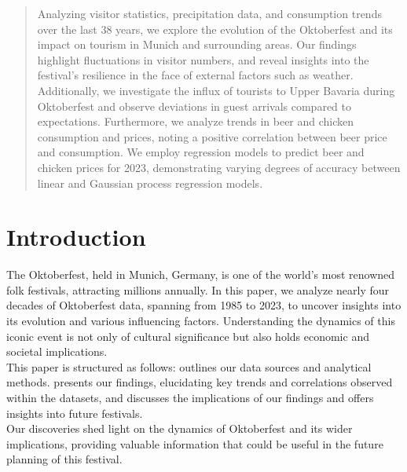 \documentclass{article}
\theoremstyle{plain}
\theoremstyle{definition}
\theoremstyle{remark}
\begin{document}
\printAffiliationsAndNotice{\icmlEqualContribution} %

\begin{abstract}
Analyzing visitor statistics, precipitation data, and consumption trends over the last 38 years, we explore the evolution of the Oktoberfest and its impact on tourism in Munich and surrounding areas. Our findings highlight fluctuations in visitor numbers, and reveal insights into the festival's resilience in the face of external factors such as weather. Additionally, we investigate the influx of tourists to Upper Bavaria during Oktoberfest and observe deviations in guest arrivals compared to expectations. Furthermore, we analyze trends in beer and chicken consumption and prices, noting a positive correlation between beer price and consumption. We employ regression models to predict beer and chicken prices for 2023, demonstrating varying degrees of accuracy between linear and Gaussian process regression models.
\end{abstract}

\section{Introduction}\label{sec:intro}
The Oktoberfest, held in Munich, Germany, is one of the world's most renowned folk festivals, attracting millions annually. In this paper, we analyze nearly four decades of Oktoberfest data, spanning from 1985 to 2023, to uncover insights into its evolution and various influencing factors. Understanding the dynamics of this iconic event is not only of cultural significance but also holds economic and societal implications. \\
 This paper is structured as follows:  outlines our data sources and analytical methods.  presents our findings, elucidating key trends and correlations observed within the datasets, and  discusses the implications of our findings and offers insights into future festivals.\\
Our discoveries shed light on the dynamics of Oktoberfest and its wider implications, providing valuable information that could be useful in the future planning of this festival.
\end{document}
